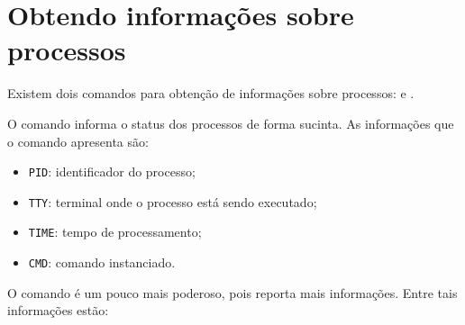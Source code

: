 \section{Obtendo informações sobre processos}
Existem dois comandos para obtenção de informações sobre processos:  e .

O comando  informa o status dos processos de forma sucinta. As informações que o comando  apresenta são:

\begin{itemize}
\setlength{\itemsep}{1pt}\setlength{\parskip}{0pt}  \setlength{\parsep}{0pt}
\item \texttt{PID}: identificador do processo;
\item \texttt{TTY}: terminal onde o processo está sendo executado;
\item \texttt{TIME}: tempo de processamento;
\item \texttt{CMD}: comando instanciado.
\end{itemize}

O comando  é um pouco mais poderoso, pois reporta mais informações.  Entre tais informações estão:

